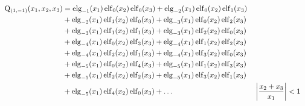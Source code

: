 \begin{equation*} \begin{aligned}
\mathrm{Q}_{(1,-1)}(x_1, x_2, x_3) &=   
  \elg_{-1}(x_1) \elf_0(x_2) \elf_0(x_3)
+ \elg_{-2}(x_1) \elf_0(x_2) \elf_1(x_3) \\ &
+ \elg_{-2}(x_1) \elf_1(x_2) \elf_0(x_3)
+ \elg_{-3}(x_1) \elf_0(x_2) \elf_2(x_3) \\ &
+ \elg_{-3}(x_1) \elf_1(x_2) \elf_1(x_3)
+ \elg_{-3}(x_1) \elf_2(x_2) \elf_0(x_3) \\ &
+ \elg_{-4}(x_1) \elf_0(x_2) \elf_3(x_3)
+ \elg_{-4}(x_1) \elf_1(x_2) \elf_2(x_3) \\ &
+ \elg_{-4}(x_1) \elf_2(x_2) \elf_1(x_3)
+ \elg_{-4}(x_1) \elf_3(x_2) \elf_0(x_3) \\ &
+ \elg_{-5}(x_1) \elf_0(x_2) \elf_4(x_3)
+ \elg_{-5}(x_1) \elf_1(x_2) \elf_3(x_3) \\ &
+ \elg_{-5}(x_1) \elf_2(x_2) \elf_2(x_3)
+ \elg_{-5}(x_1) \elf_3(x_2) \elf_1(x_3) \\ &
+ \elg_{-5}(x_1) \elf_4(x_2) \elf_0(x_3)
+ \ldots & 
&\left| \frac{x_2 + x_3}{x_1} \right| < 1 \\
\end{aligned} \end{equation*}